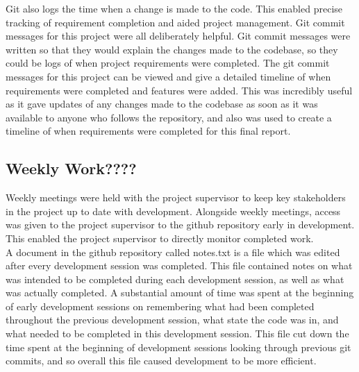 \documentclass{article}
\begin{document}
Git also logs the time when a change is made to the code. This enabled precise tracking of requirement completion and aided project management. Git commit messages for this project were all deliberately helpful. Git commit messages were written so that they would explain the changes made to the codebase, so they could be logs of when project requirements were completed. The git commit messages for this project can be viewed and give a detailed timeline of when requirements were completed and features were added. This was incredibly useful as it gave updates of any changes made to the codebase as soon as it was available to anyone who follows the repository, and also was used to create a timeline of when requirements were completed for this final report. \\

\subsection{Weekly Work????}

Weekly meetings were held with the project supervisor to keep key stakeholders in the project up to date with development. Alongside weekly meetings, access was given to the project supervisor to the  github repository early in development. This enabled the project supervisor to directly monitor completed work. \\

A document in the github repository called notes.txt is a file which was edited after every development session was completed. This file contained notes on what was intended to be completed during each development session, as well as what was actually completed. A substantial amount of time was spent at the beginning of early development sessions on remembering what had been completed throughout the previous development session, what state the code was in, and what needed to be completed in this development session. This file cut down the time spent at the beginning of development sessions looking through previous git commits, and so overall this file caused development to be more efficient. \\

\end{document}
